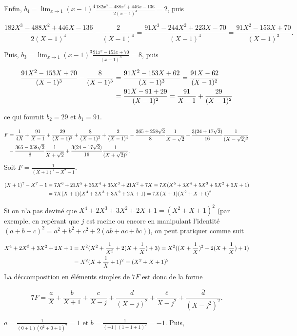 {{Enfin, $b_4=\lim_{x\rightarrow 1}(x-1)^4\frac{182x^3-488x^2+446x-136}{2(x-1)^4}=2$, puis

$$\frac{182X^3-488X^2+446X-136}{2(X-1)^4}-\frac{2}{(X-1)^4}=\frac{91X^3-244X^2+223X-70}{(X-1)^4}
=\frac{91X^2-153X+70}{(X-1)^3}.$$

Puis, $b_3=\lim_{x\rightarrow 1}(x-1)^3\frac{91x^2-153x+70}{(x-1)^3}=8$, puis

\begin{align*}\ensuremath
\frac{91X^2-153X+70}{(X-1)^3}-\frac{8}{(X-1)^3}&=\frac{91X^2-153X+62}{(X-1)^3}=\frac{91X-62}{(X-1)^2}\\
 &=\frac{91X-91+29}{(X-1)^2}=\frac{91}{X-1}+\frac{29}{(X-1)^2}
\end{align*}

ce qui fournit $b_2=29$ et $b_1=91$.

\begin{align*}\ensuremath
F&=\frac{1}{4X}+\frac{91}{X-1}+\frac{29}{(X-1)^2}+\frac{8}{(X-1)^3}+\frac{2}{(X-1)^4}
-\frac{365+258\sqrt{2}}{8}\frac{1}{X-\sqrt{2}}+\frac{3(24+17\sqrt{2})}{16}\frac{1}{(X-\sqrt{2})^2}\\
 &-\frac{365-258\sqrt{2}}{8}\frac{1}{X+\sqrt{2}}+\frac{3(24-17\sqrt{2})}{16}\frac{1}{(X+\sqrt{2})^2}.
\end{align*}
Soit $F=\frac{1}{(X+1)^7-X^7-1}$.

\begin{align*}\ensuremath
(X+1)^7-X^7-1&=7X^6+21X^5+35X^4+35X^3+21X^2+7X=7X(X^5+3X^4+5X^3+5X^2+3X+1)\\
 &=7X(X+1)(X^4+2X^3+3X^2+2X+1)=7X(X+1)(X^2+X+1)^2
\end{align*}

Si on n'a pas deviné que $X^4+2X^3+3X^2+2X+1=(X^2+X+1)^2$ (par exemple, en repérant que $j$ est racine ou encore en manipulant l'identité $(a+b+c)^2=a^2+b^2+c^2+2(ab+ac+bc)$), on peut pratiquer comme suit

\begin{align*}\ensuremath
X^4+2X^3+3X^2+2X+1&=X^2(X^2+\frac{1}{X^2}+2(X+\frac{1}{X})+3)=X^2((X+\frac{1}{X})^2+2(X+\frac{1}{X})+1)\\
 &=X^2(X+\frac{1}{X}+1)^2=(X^2+X+1)^2
\end{align*}
La déccomposition en éléments simples de $7F$ est donc de la forme

$$7F=\frac{a}{X}+\frac{b}{X+1}+\frac{c}{X-j}+\frac{d}{(X-j)^2}+\frac{\overline{c}}{X-j^2}+\frac{\overline{d}}{(X-j^2)^2}.$$

$a=\frac{1}{(0+1)(0^2+0+1)^2}=1$ et $b=\frac{1}{(-1)(1-1+1)^2}=-1$. Puis,

}}
